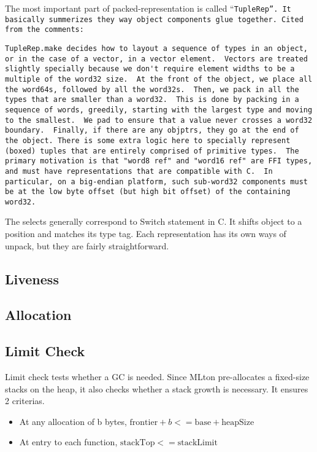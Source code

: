 The most important part of packed-representation is called
``\tt{TupleRep}''. It basically summerizes they way object components
glue together. Cited from the comments:

\begin{verbatim}
TupleRep.make decides how to layout a sequence of types in an object,
or in the case of a vector, in a vector element.  Vectors are treated
slightly specially because we don't require element widths to be a
multiple of the word32 size.  At the front of the object, we place all
the word64s, followed by all the word32s.  Then, we pack in all the
types that are smaller than a word32.  This is done by packing in a
sequence of words, greedily, starting with the largest type and moving
to the smallest.  We pad to ensure that a value never crosses a word32
boundary.  Finally, if there are any objptrs, they go at the end of
the object. There is some extra logic here to specially represent
(boxed) tuples that are entirely comprised of primitive types.  The
primary motivation is that "word8 ref" and "word16 ref" are FFI types,
and must have representations that are compatible with C.  In
particular, on a big-endian platform, such sub-word32 components must
be at the low byte offset (but high bit offset) of the containing
word32.
\end{verbatim}

The selects generally correspond to Switch statement in C. It shifts
object to a position and matches its type tag. Each representation has
its own ways of unpack, but they are fairly straightforward.

\subsection{Liveness}

\subsection{Allocation}

\subsection{Limit Check}
Limit check tests whether a GC is needed. Since MLton pre-allocates a
fixed-size stacks on the heap, it also checks whether a stack growth
is necessary. It ensures 2 criterias.

\begin{itemize}
\item At any allocation of b bytes, $\mbox{frontier} + b <=
  \mbox{base} + \mbox{heapSize}$
\item At entry to each function, $\mbox{stackTop} <=
  \mbox{stackLimit}$
\end{itemize}

